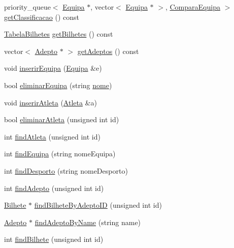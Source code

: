 \begin{DoxyCompactItemize}
\item 
priority\+\_\+queue$<$ \hyperlink{class_equipa}{Equipa} $\ast$, vector$<$ \hyperlink{class_equipa}{Equipa} $\ast$ $>$, \hyperlink{struct_compara_equipa}{Compara\+Equipa} $>$ \hyperlink{class_campeonato_afda18276213885efcef77c32399da3f0}{get\+Classificacao} () const 
\item 
\hyperlink{_campeonato_8h_a0efe3260dc555069d2fe679dc67d0425}{Tabela\+Bilhetes} \hyperlink{class_campeonato_a3dc9d23cc2459348e8687e49e90f3ad5}{get\+Bilhetes} () const 
\item 
vector$<$ \hyperlink{class_adepto}{Adepto} $\ast$ $>$ \hyperlink{class_campeonato_a7ff979e7d6fac2b8db0e23b313bd90c4}{get\+Adeptos} () const 
\item 
void \hyperlink{class_campeonato_a10a9d48eb0f700e6f12e2b1d0d35af14}{inserir\+Equipa} (\hyperlink{class_equipa}{Equipa} \&e)
\item 
bool \hyperlink{class_campeonato_ae0967bb24d6fbb19ea384e6643fc1612}{eliminar\+Equipa} (string \hyperlink{class_campeonato_a670b0857b7a8bc3c5dbf0f927ee192fe}{nome})
\item 
void \hyperlink{class_campeonato_ab42ec0da76a4a0f0eecf276ad32d2102}{inserir\+Atleta} (\hyperlink{class_atleta}{Atleta} \&a)
\item 
bool \hyperlink{class_campeonato_ad2325b03cc23f95cad86d0ca6fb7556b}{eliminar\+Atleta} (unsigned int id)
\item 
int \hyperlink{class_campeonato_a662db361dc8464fa6ced60048e45ca1a}{find\+Atleta} (unsigned int id)
\item 
int \hyperlink{class_campeonato_a8002616a409e12a1ba2798d60c04f9dc}{find\+Equipa} (string nome\+Equipa)
\item 
int \hyperlink{class_campeonato_a64574dd8d105367c49d794a42e4a2aa8}{find\+Desporto} (string nome\+Desporto)
\item 
int \hyperlink{class_campeonato_a3f5bea63c04b04a25d88bdcf1845a2eb}{find\+Adepto} (unsigned int id)
\item 
\hyperlink{class_bilhete}{Bilhete} $\ast$ \hyperlink{class_campeonato_a82214183a5bc3f6c18c794e8730285c4}{find\+Bilhete\+By\+Adepto\+I\+D} (unsigned int id)
\item 
\hyperlink{class_adepto}{Adepto} $\ast$ \hyperlink{class_campeonato_ae127b541ffdc1994863d08626bca87ac}{find\+Adepto\+By\+Name} (string name)
\item 
int \hyperlink{class_campeonato_a37735a0ee25a3e23b3da0712eddda841}{find\+Bilhete} (unsigned int id)
\item 

\end{DoxyCompactItemize}

